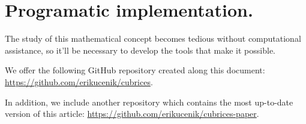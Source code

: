 \section{Programatic implementation.}

The study of this mathematical concept becomes tedious without computational assistance, so it'll be necessary to develop the tools that make it possible.

We offer the following GitHub repository created along this document: \href{https://github.com/erikucenik/cubrices}{https://github.com/erikucenik/cubrices}.

In addition, we include another repository which contains the most up-to-date version of this article: \href{https://github.com/erikucenik/cubrices-paper}{https://github.com/erikucenik/cubrices-paper}.

